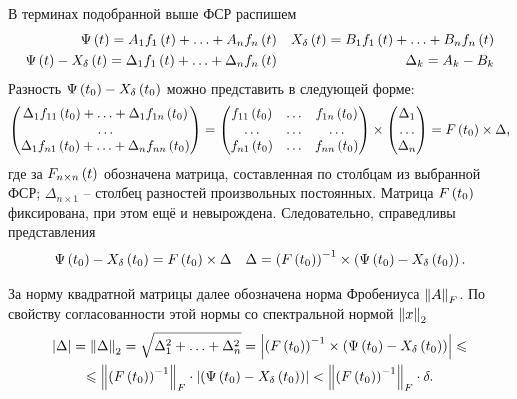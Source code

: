 \documentclass[a5paper,10pt]{article}
\begin{document}
В терминах подобранной выше ФСР распишем
\begin{align*}
\Psi\left(t\right) = A_{1} f_{1}\left(t\right) + \ldots + A_{n} f_{n}\left(t\right) 
&&  X_{\delta}\left(t\right) = B_{1} f_{1}\left(t\right) + \ldots + B_{n} f_{n}\left(t\right) 
\\ \Psi\left(t\right) - X_{\delta}\left(t\right) = \Delta_{1} f_{1}\left(t\right) + \ldots + \Delta_{n} f_{n}\left(t\right) 
&& \Delta_{k} = A_{k} - B_{k}
\end{align*}
Разность $\Psi\left(t_{0}\right) - X_{\delta}\left(t_{0}\right)$ можно представить в следующей форме:
$$
\begin{pmatrix}
\Delta_{1} f_{11}\left(t_{0}\right) + \ldots + \Delta_{1} f_{1n}\left(t_{0}\right) \\
\ldots \\
\Delta_{1} f_{n1}\left(t_{0}\right) + \ldots + \Delta_{n} f_{nn}\left(t_{0}\right) 
\end{pmatrix}
= 
\begin{pmatrix}
f_{11}\left(t_{0}\right) & \ldots & f_{1n}\left(t_{0}\right) \\
\ldots & \ldots & \ldots \\
f_{n1}\left(t_{0}\right) & \ldots & f_{nn}\left(t_{0}\right) \\
\end{pmatrix}
\times
\begin{pmatrix}
\Delta_{1} \\ \ldots \\ \Delta_{n}
\end{pmatrix}
= F\left(t_{0}\right) \times \Delta,
$$
где за $F_{n \times n}\left(t\right)$ обозначена матрица, составленная по столбцам из выбранной ФСР; $\Delta_{n \times 1}$ -- столбец разностей произвольных постоянных.  Матрица $F\left(t_{0}\right)$ фиксирована, при этом ещё и невырождена. Следовательно, справедливы представления
\begin{align*}
\Psi\left(t_{0}\right) - X_{\delta}\left(t_{0}\right) = F\left(t_{0}\right) \times \Delta 
&& \Delta = \left(F\left(t_{0}\right)\right)^{-1} \times \left(\Psi\left(t_{0}\right) - X_{\delta}\left(t_{0}\right)\right).
\end{align*}

За норму квадратной матрицы далее обозначена норма Фробениуса $\left\lVert A\right\rVert_{F}$. По свойству согласованности этой нормы со спектральной нормой $\left\lVert x\right\rVert_{2}$
\begin{multline*}
\left|\Delta\right| = \left\lVert\Delta\right\rVert_{2}
= \sqrt{\Delta_{1}^2 + \ldots + \Delta_{n}^2}
= \left|\left(F\left(t_{0}\right)\right)^{-1} \times \left(\Psi\left(t_{0}\right) - X_{\delta}\left(t_{0}\right)\right)\right| \leqslant 
\\ \leqslant \left\lVert\left(F\left(t_{0}\right)\right)^{-1}\right\rVert_{F} \cdot \left|\left(\Psi\left(t_{0}\right) - X_{\delta}\left(t_{0}\right)\right)\right|
< \left\lVert\left(F\left(t_{0}\right)\right)^{-1}\right\rVert_{F} \cdot \delta.
\end{multline*}
\end{document}
